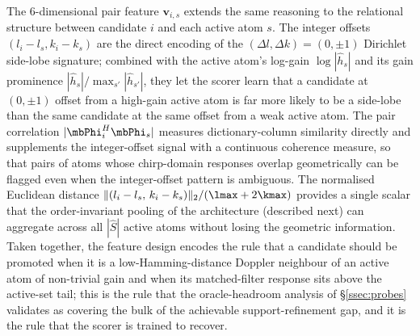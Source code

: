 The 6-dimensional pair feature $\mathbf{v}_{i,s}$ extends the same reasoning to the relational structure between candidate $i$ and each active atom $s$. The integer offsets $(l_i - l_s, k_i - k_s)$ are the direct encoding of the $(\Delta l, \Delta k) = (0, \pm 1)$ Dirichlet side-lobe signature; combined with the active atom's log-gain $\log|\hat{h}_s|$ and its gain prominence $|\hat{h}_s| / \max_{s'}|\hat{h}_{s'}|$, they let the scorer learn that a candidate at $(0, \pm 1)$ offset from a high-gain active atom is far more likely to be a side-lobe than the same candidate at the same offset from a weak active atom. The pair correlation $|\mbPhi_i^H \mbPhi_s|$ measures dictionary-column similarity directly and supplements the integer-offset signal with a continuous coherence measure, so that pairs of atoms whose chirp-domain responses overlap geometrically can be flagged even when the integer-offset pattern is ambiguous. The normalised Euclidean distance $\|(l_i - l_s,\, k_i - k_s)\|_2 / (\lmax + 2\kmax)$ provides a single scalar that the order-invariant pooling of the architecture (described next) can aggregate across all $|\hat{S}|$ active atoms without losing the geometric information. Taken together, the feature design encodes the rule that a candidate should be promoted when it is a low-Hamming-distance Doppler neighbour of an active atom of non-trivial gain and when its matched-filter response sits above the active-set tail; this is the rule that the oracle-headroom analysis of \S\ref{ssec:probes} validates as covering the bulk of the achievable support-refinement gap, and it is the rule that the scorer is trained to recover.

